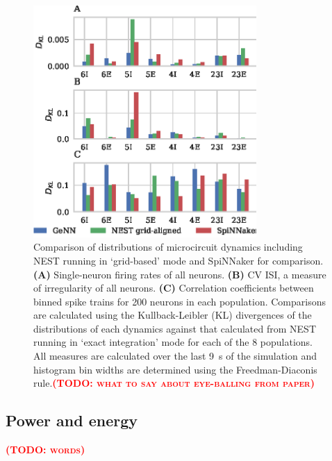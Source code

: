 \documentclass[utf8]{frontiersSCNS} %
\newcommand{\todo}[1]{\textbf{\textsc{\textcolor{red}{(TODO: #1)}}}}
\begin{document}
\begin{figure}
    \begin{center}
        \includegraphics[width=85mm]{figures/microcircuit_accuracy_kl}
    \end{center}
    \caption{Comparison of distributions of microcircuit dynamics including NEST running in `grid-based' mode and SpiNNaker for comparison.
    \textbf{(A)} Single-neuron firing rates of all neurons.
    \textbf{(B)} CV ISI, a measure of irregularity of all neurons.
    \textbf{(C)} Correlation coefficients between binned spike trains for \num{200} neurons in each population.
    Comparisons are calculated using the Kullback-Leibler (KL) divergences of the distributions of each dynamics against that calculated from NEST running in `exact integration' mode for each of the 8 populations.
    All measures are calculated over the last \SI{9}{\second} of the simulation and histogram bin widths are determined using the Freedman-Diaconis rule.\todo{what to say about eye-balling from paper}}
    \label{fig:microcircuit_accuracy_kl}
\end{figure}


\subsection{Power and energy}
\todo{words}
\end{document}
